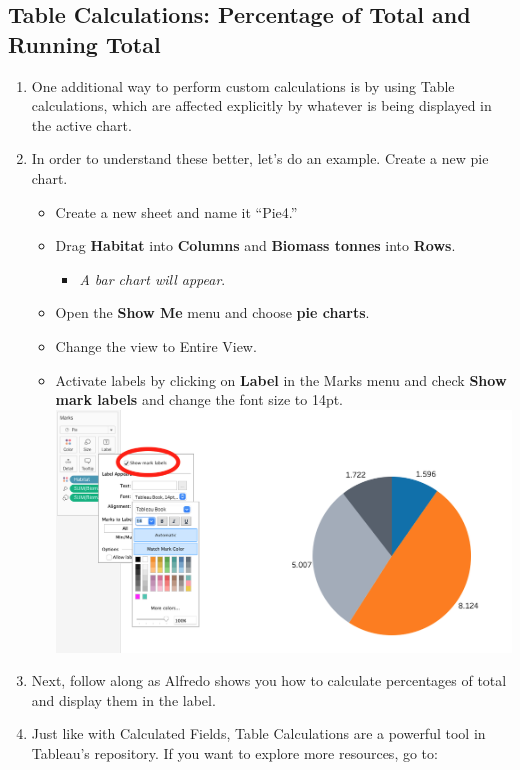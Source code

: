 \documentclass[
]{book}
\providecommand{\tightlist}{%
  \setlength{\itemsep}{0pt}\setlength{\parskip}{0pt}}
\begin{document}
\hypertarget{table-calculations-percentage-of-total-and-running-total}{%
\subsection{Table Calculations: Percentage of Total and Running Total}\label{table-calculations-percentage-of-total-and-running-total}}

\begin{enumerate}
\def\labelenumi{\arabic{enumi}.}
\tightlist
\item
  One additional way to perform custom calculations is by using Table calculations, which are affected explicitly by whatever is being displayed in the active chart.
\item
  In order to understand these better, let's do an example. Create a new pie chart.

  \begin{itemize}
  \tightlist
  \item
    Create a new sheet and name it ``Pie4.''
  \item
    Drag \textbf{Habitat} into \textbf{Columns} and \textbf{Biomass tonnes} into \textbf{Rows}.

    \begin{itemize}
    \tightlist
    \item
      \emph{A bar chart will appear}.
    \end{itemize}
  \item
    Open the \textbf{Show Me} menu and choose \textbf{pie charts}.
  \item
    Change the view to Entire View.
  \item
    Activate labels by clicking on \textbf{Label} in the Marks menu and check \textbf{Show mark labels} and change the font size to 14pt.
    \includegraphics{images/m3s4_pie-show-labels.png}
  \end{itemize}
\item
  Next, follow along as Alfredo shows you how to calculate percentages of total and display them in the label.\\
\item
  Just like with Calculated Fields, Table Calculations are a powerful tool in Tableau's repository. If you want to explore more resources, go to:


\end{enumerate}
\end{document}
